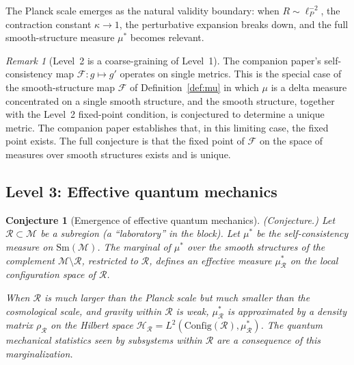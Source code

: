 \documentclass[12pt,a4paper]{article}
\newtheorem{conjecture}{Conjecture}
\theoremstyle{definition}
\theoremstyle{remark}
\newtheorem{remark}{Remark}
\begin{document}
The Planck scale emerges as the natural validity boundary: when $R \sim
\ell_P^{-2}$, the contraction constant $\kappa \to 1$, the perturbative
expansion breaks down, and the full smooth-structure measure $\mu^*$ becomes
relevant.

\begin{remark}[Level~2 is a coarse-graining of Level~1]
The companion paper's self-consistency map $\mathcal{F}: g \mapsto g'$ operates
on single metrics. This is the special case of the smooth-structure map
$\mathcal{F}$ of Definition~\ref{def:mu} in which $\mu$ is a delta measure
concentrated on a single smooth structure, and the smooth structure, together
with the Level~2 fixed-point condition, is conjectured to determine a unique
metric. The companion paper establishes that, in this limiting case,
the fixed point exists. The full conjecture is that the fixed point of $\mathcal{F}$
on the space of measures over smooth structures exists and is unique.
\end{remark}

\subsection{Level 3: Effective quantum mechanics}
\label{sec:level3}

\begin{conjecture}[Emergence of effective quantum mechanics]
\emph{(Conjecture.)}
\label{conj:qm}
Let $\mathcal{R} \subset \mathcal{M}$ be a subregion (a ``laboratory'' in the
block). Let $\mu^*$ be the self-consistency measure on
$\mathrm{Sm}(\mathcal{M})$. The marginal of $\mu^*$ over the smooth structures
of the complement $\mathcal{M} \setminus \mathcal{R}$, restricted to
$\mathcal{R}$, defines an effective measure $\mu^*_\mathcal{R}$ on the local
configuration space of $\mathcal{R}$.

When $\mathcal{R}$ is much larger than the Planck scale but much smaller than
the cosmological scale, and gravity within $\mathcal{R}$ is weak, $\mu^*_\mathcal{R}$
is approximated by a density matrix $\rho_\mathcal{R}$ on the Hilbert space
$\mathcal{H}_\mathcal{R} = L^2(\mathrm{Config}(\mathcal{R}), \mu^*_\mathcal{R})$.
The quantum mechanical statistics seen by subsystems within $\mathcal{R}$ are
a consequence of this marginalization.
\end{conjecture}
\end{document}
